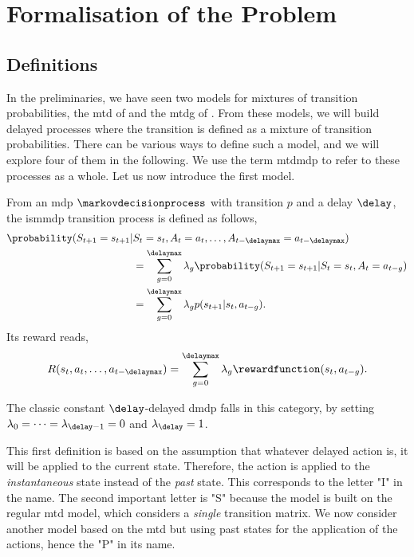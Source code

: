 \section{Formalisation of the Problem}
\label{subsec:formalisation_mtdmdp}

\subsection{Definitions}

In the preliminaries, we have seen two models for mixtures of transition probabilities, the \gls{mtd} of  and the \gls{mtdg} of .
From these models, we will build delayed processes where the transition is defined as a mixture of transition probabilities. 
There can be various ways to define such a model, and we will explore four of them in the following.
We use the term \gls{mtdmdp} to refer to these processes as a whole.
Let us now introduce the first model.

\begin{defi}
    From an \gls{mdp} $\markovdecisionprocess$ with transition $p$ and a delay $\delay$, the \gls{ismmdp} transition process is defined as follows,
    \begin{align*}
        \probability(S_{t+1}=s_{t+1}\vert& S_{t}=s_{t},A_{t}=a_{t},\dots,A_{t-\delaymax}=a_{t-\delaymax})
        \\
        &=\sum_{g=0}^\delaymax \lambda_g \probability(S_{t+1}=s_{t+1}\vert S_{t}=s_{t},A_{t}=a_{t-g})
        \\
        &= \sum_{g=0}^\delaymax \lambda_g p(s_{t+1}\vert s_{t},a_{t-g}).
    \end{align*}
    Its reward reads,
    \begin{align*}
        R(s_{t},a_{t},\dots,a_{t-\delaymax}) = \sum_{g=0}^\delaymax \lambda_g \rewardfunction(s_{t},a_{t-g}).
    \end{align*}
\end{defi}


\begin{remark}
    The classic constant $\delay$-delayed \gls{dmdp} falls in this category, by setting $\lambda_0=\dots=\lambda_{\delay-1}=0$ and $\lambda_\delay=1$.
\end{remark}

This first definition is based on the assumption that whatever delayed action is, it will be applied to the current state. 
Therefore, the action is applied to the \emph{instantaneous} state instead of the \emph{past} state.
This corresponds to the letter "I" in the name.
The second important letter is "S" because the model is built on the regular \gls{mtd} model, which considers a \emph{single} transition matrix.
We now consider another model based on the \gls{mtd} but using past states for the application of the actions, hence the "P" in its name.

